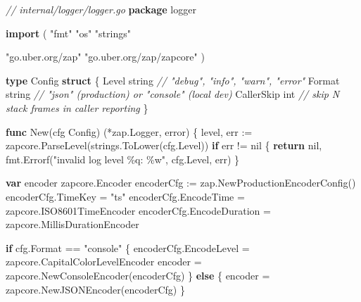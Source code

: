\documentclass[
]{article}
\newenvironment{Shaded}{}{}
\newcommand{\CommentTok}[1]{\textcolor[rgb]{0.38,0.63,0.69}{\textit{#1}}}
\newcommand{\ControlFlowTok}[1]{\textcolor[rgb]{0.00,0.44,0.13}{\textbf{#1}}}
\newcommand{\DataTypeTok}[1]{\textcolor[rgb]{0.56,0.13,0.00}{#1}}
\newcommand{\KeywordTok}[1]{\textcolor[rgb]{0.00,0.44,0.13}{\textbf{#1}}}
\newcommand{\NormalTok}[1]{#1}
\newcommand{\OperatorTok}[1]{\textcolor[rgb]{0.40,0.40,0.40}{#1}}
\newcommand{\OtherTok}[1]{\textcolor[rgb]{0.00,0.44,0.13}{#1}}
\newcommand{\StringTok}[1]{\textcolor[rgb]{0.25,0.44,0.63}{#1}}
\begin{document}
\begin{Shaded}
\begin{Highlighting}[]
\CommentTok{// internal/logger/logger.go}
\KeywordTok{package}\NormalTok{ logger}

\KeywordTok{import} \OperatorTok{(}
    \StringTok{"fmt"}
    \StringTok{"os"}
    \StringTok{"strings"}

    \StringTok{"go.uber.org/zap"}
    \StringTok{"go.uber.org/zap/zapcore"}
\OperatorTok{)}

\KeywordTok{type}\NormalTok{ Config }\KeywordTok{struct} \OperatorTok{\{}
\NormalTok{    Level      }\DataTypeTok{string} \CommentTok{// "debug", "info", "warn", "error"}
\NormalTok{    Format     }\DataTypeTok{string} \CommentTok{// "json" (production) or "console" (local dev)}
\NormalTok{    CallerSkip }\DataTypeTok{int}    \CommentTok{// skip N stack frames in caller reporting}
\OperatorTok{\}}

\KeywordTok{func}\NormalTok{ New}\OperatorTok{(}\NormalTok{cfg Config}\OperatorTok{)} \OperatorTok{(*}\NormalTok{zap}\OperatorTok{.}\NormalTok{Logger}\OperatorTok{,} \DataTypeTok{error}\OperatorTok{)} \OperatorTok{\{}
\NormalTok{    level}\OperatorTok{,}\NormalTok{ err }\OperatorTok{:=}\NormalTok{ zapcore}\OperatorTok{.}\NormalTok{ParseLevel}\OperatorTok{(}\NormalTok{strings}\OperatorTok{.}\NormalTok{ToLower}\OperatorTok{(}\NormalTok{cfg}\OperatorTok{.}\NormalTok{Level}\OperatorTok{))}
    \ControlFlowTok{if}\NormalTok{ err }\OperatorTok{!=} \OtherTok{nil} \OperatorTok{\{}
        \ControlFlowTok{return} \OtherTok{nil}\OperatorTok{,}\NormalTok{ fmt}\OperatorTok{.}\NormalTok{Errorf}\OperatorTok{(}\StringTok{"invalid log level \%q: \%w"}\OperatorTok{,}\NormalTok{ cfg}\OperatorTok{.}\NormalTok{Level}\OperatorTok{,}\NormalTok{ err}\OperatorTok{)}
    \OperatorTok{\}}

    \KeywordTok{var}\NormalTok{ encoder zapcore}\OperatorTok{.}\NormalTok{Encoder}
\NormalTok{    encoderCfg }\OperatorTok{:=}\NormalTok{ zap}\OperatorTok{.}\NormalTok{NewProductionEncoderConfig}\OperatorTok{()}
\NormalTok{    encoderCfg}\OperatorTok{.}\NormalTok{TimeKey }\OperatorTok{=} \StringTok{"ts"}
\NormalTok{    encoderCfg}\OperatorTok{.}\NormalTok{EncodeTime }\OperatorTok{=}\NormalTok{ zapcore}\OperatorTok{.}\NormalTok{ISO8601TimeEncoder}
\NormalTok{    encoderCfg}\OperatorTok{.}\NormalTok{EncodeDuration }\OperatorTok{=}\NormalTok{ zapcore}\OperatorTok{.}\NormalTok{MillisDurationEncoder}

    \ControlFlowTok{if}\NormalTok{ cfg}\OperatorTok{.}\NormalTok{Format }\OperatorTok{==} \StringTok{"console"} \OperatorTok{\{}
\NormalTok{        encoderCfg}\OperatorTok{.}\NormalTok{EncodeLevel }\OperatorTok{=}\NormalTok{ zapcore}\OperatorTok{.}\NormalTok{CapitalColorLevelEncoder}
\NormalTok{        encoder }\OperatorTok{=}\NormalTok{ zapcore}\OperatorTok{.}\NormalTok{NewConsoleEncoder}\OperatorTok{(}\NormalTok{encoderCfg}\OperatorTok{)}
    \OperatorTok{\}} \ControlFlowTok{else} \OperatorTok{\{}
\NormalTok{        encoder }\OperatorTok{=}\NormalTok{ zapcore}\OperatorTok{.}\NormalTok{NewJSONEncoder}\OperatorTok{(}\NormalTok{encoderCfg}\OperatorTok{)}
    \OperatorTok{\}}


\end{Highlighting}
\end{Shaded}
\end{document}
